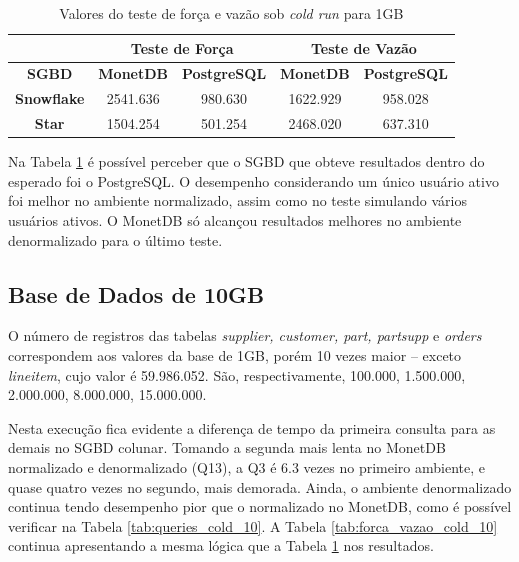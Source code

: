 \begin{table}[htpb]
        \centering
        \caption{Valores do teste de força e vazão sob \textit{cold run} para 1GB}
        \label{tab:forca_vazao_cold_1}
        \begin{tabular}{|c|c|c|c|c|} 
        \cline{2-5}
        \multicolumn{1}{c|}{} & \multicolumn{2}{c|}{\textbf{Teste de Força} } & \multicolumn{2}{c|}{\textbf{Teste de Vazão} }  \\ 
        \hline
                \textbf{SGBD}        & \textbf{MonetDB}  & \textbf{PostgreSQL}       & \textbf{MonetDB}  & \textbf{PostgreSQL}        \\ 
        \hline
                \textbf{Snowflake}   & 2541.636          & 980.630                   & 1622.929          & 958.028                    \\ 
        \hline
                \textbf{Star}        & 1504.254          & 501.254                   & 2468.020          & 637.310                    \\
        \hline
        \end{tabular}
\end{table}

Na Tabela \ref{tab:forca_vazao_cold_1} é possível perceber que o SGBD que obteve resultados dentro do esperado foi o PostgreSQL. O desempenho considerando um único usuário ativo foi melhor no ambiente normalizado, assim como no teste simulando vários usuários ativos. O MonetDB só alcançou resultados melhores no ambiente denormalizado para o último teste.



\subsection{Base de Dados de 10GB}

O número de registros das tabelas \textit{supplier, customer, part, partsupp} e \textit{orders} correspondem aos valores da base de 1GB, porém 10 vezes maior -- exceto \textit{lineitem}, cujo valor é 59.986.052. São, respectivamente, 100.000, 1.500.000, 2.000.000, 8.000.000, 15.000.000.

Nesta execução fica evidente a diferença de tempo da primeira consulta para as demais no SGBD colunar. Tomando a segunda mais lenta no MonetDB normalizado e denormalizado (Q13), a Q3 é 6.3 vezes no primeiro ambiente, e quase quatro vezes no segundo, mais demorada. Ainda, o ambiente denormalizado continua tendo desempenho pior que o normalizado no MonetDB, como é possível verificar na Tabela \ref{tab:queries_cold_10}. A Tabela \ref{tab:forca_vazao_cold_10} continua apresentando a mesma lógica que a Tabela \ref{tab:forca_vazao_cold_1} nos resultados.

